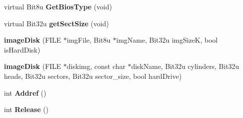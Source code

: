 \begin{DoxyCompactItemize}
\item 
\hypertarget{classimageDisk_a2ed19ea20ecd334122a6bee309a37918}{virtual Bit8u {\bfseries Get\-Bios\-Type} (void)}\label{classimageDisk_a2ed19ea20ecd334122a6bee309a37918}

\item 
\hypertarget{classimageDisk_ab408b88ad0133108ba8469638be88cc5}{virtual Bit32u {\bfseries get\-Sect\-Size} (void)}\label{classimageDisk_ab408b88ad0133108ba8469638be88cc5}

\item 
\hypertarget{classimageDisk_ad1149bdea114f2c61df5252f20638155}{{\bfseries image\-Disk} (F\-I\-L\-E $\ast$img\-File, Bit8u $\ast$img\-Name, Bit32u img\-Size\-K, bool is\-Hard\-Disk)}\label{classimageDisk_ad1149bdea114f2c61df5252f20638155}

\item 
\hypertarget{classimageDisk_ac9bf6a607b2164fe630ec0ad4c4feb72}{{\bfseries image\-Disk} (F\-I\-L\-E $\ast$diskimg, const char $\ast$disk\-Name, Bit32u cylinders, Bit32u heads, Bit32u sectors, Bit32u sector\-\_\-size, bool hard\-Drive)}\label{classimageDisk_ac9bf6a607b2164fe630ec0ad4c4feb72}

\item 
\hypertarget{classimageDisk_a5291cb5aee8b109f4934fc1c24293e91}{int {\bfseries Addref} ()}\label{classimageDisk_a5291cb5aee8b109f4934fc1c24293e91}

\item 
\hypertarget{classimageDisk_a256b0cf2238f1364e3d9675242d69700}{int {\bfseries Release} ()}\label{classimageDisk_a256b0cf2238f1364e3d9675242d69700}

\end{DoxyCompactItemize}
